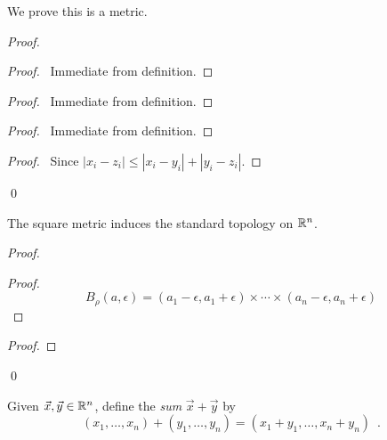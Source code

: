 We prove this is a metric.

\begin{proof}
    \pf
    \begin{proof}
        \pf\ Immediate from definition.
    \end{proof}
    \begin{proof}
        \pf\ Immediate from definition.
    \end{proof}
    \begin{proof}
        \pf\ Immediate from definition.
    \end{proof}
    \begin{proof}
        \pf\ Since $|x_i - z_i| \leq |x_i - y_i| + |y_i - z_i|$.
    \end{proof}
    \qed
\end{proof}

\begin{proposition}
    The square metric induces the standard topology on $\mathbb{R}^n$.
\end{proposition}

\begin{proof}
    \pf
    \begin{proof}
        \pf
        \[ B_\rho(a, \epsilon) = (a_1 - \epsilon, a_1 + \epsilon) \times \cdots \times (a_n - \epsilon, a_n + \epsilon) \]
    \end{proof}
    \begin{proof}
    \end{proof}
    \qed
\end{proof}

\begin{definition}
    Given $\vec{x}, \vec{y} \in \mathbb{R}^n$, define the \emph{sum} $\vec{x} + \vec{y}$ by
    \[ (x_1, \ldots, x_n) + (y_1, \ldots, y_n) = (x_1 + y_1, \ldots, x_n + y_n) \enspace . \]
\end{definition}

